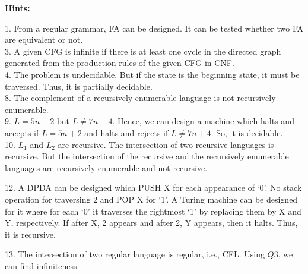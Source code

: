 \documentclass[11pt]{article}
\begin{document}
\hspace*{-0.5cm}
\textbf{Hints:}

\vspace*{0.1cm}
1. From a regular grammar, FA can be designed. It can be tested whether two FA are equivalent
or not.\\

\vspace*{0.2cm}
3. A given CFG is infinite if there is at least one cycle in the directed graph generated from the
production rules of the given CFG in CNF.\\

\vspace*{0.2cm}
4. The problem is undecidable. But if the state is the beginning state, it must be traversed. Thus, it is
partially decidable.\\

\vspace*{0.2cm}
8. The complement of a recursively enumerable language is not recursively enumerable.\\

\vspace*{0.2cm}
9. $L = 5n + 2$ but $L \neq 7n + 4$. Hence, we can design a machine which halts and accepts if $L = 5n + 2$
and halts and rejects if $L \neq 7n + 4$. So, it is decidable.\\

\vspace*{0.2cm}
10. $L _{1}$ and $L _{2}$ are recursive. The intersection of two recursive languages is recursive. But the intersection
of the recursive and the recursively enumerable languages are recursively enumerable and
not recursive.\\

\vspace*{0.2cm}

12. A DPDA can be designed which PUSH X for each appearance of ‘0’. No stack operation for
traversing 2 and POP X for ‘1’. A Turing machine can be designed for it where for each ‘0’ it
traverses the rightmost ‘1’ by replacing them by X and Y, respectively. If after X, 2 appears and
after 2, Y appears, then it halts. Thus, it is recursive.\\
\vspace*{0.2cm}

13. The intersection of two regular language is regular, i.e., CFL. Using $Q3$, we can find infiniteness.\\
\vspace*{0.2cm}
\end{document}
